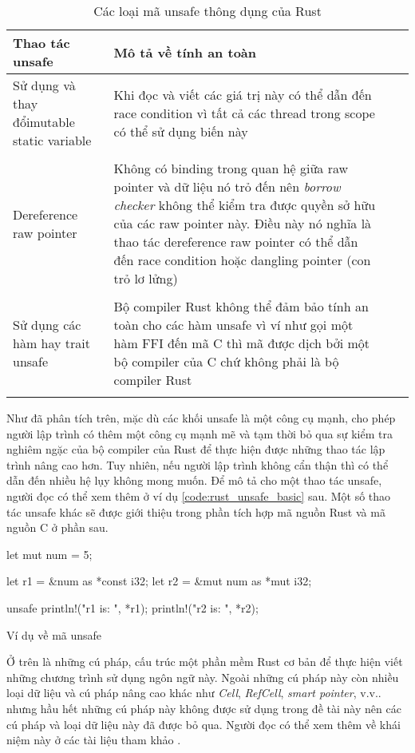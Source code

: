 \begin{longtable}{>{\raggedleft\arraybackslash}p{6cm}|p{7cm}  >{\raggedleft\arraybackslash}p{5cm}|p{7cm}}
\textbf{Thao tác unsafe} & \textbf{Mô tả về tính an toàn} \\
\midrule
\endhead
Sử dụng và thay đổi\linebreak mutable static variable & Khi đọc và viết các giá trị này có thể dẫn đến race condition vì tất cả các thread trong scope có thể sử dụng biến này \\
\\
Dereference raw pointer & Không có binding trong quan hệ giữa raw pointer và dữ liệu nó trỏ đến nên \emph{borrow checker} không thể kiểm tra được quyền sở hữu của các raw pointer này. Điều này nó nghĩa là thao tác dereference raw pointer có thể dẫn đến race condition hoặc dangling pointer (con trỏ lơ lửng)\\
\\
Sử dụng các hàm hay trait unsafe & Bộ compiler Rust không thể đảm bảo tính an toàn cho các hàm unsafe vì ví như gọi một hàm FFI đến mã C thì mã được dịch bởi một bộ compiler của C chứ không phải là bộ compiler Rust\\
\bottomrule
\caption{Các loại mã unsafe thông dụng của Rust}
\label{tbl:rust_unsafe}
\end{longtable}
Như đã phân tích trên, mặc dù các khối unsafe là một công cụ mạnh, cho phép người lập trình có thêm một công cụ mạnh mẽ và tạm thời bỏ qua sự kiểm tra nghiêm ngặc của bộ compiler của Rust để thực hiện được những thao tác lập trình nâng cao hơn.
Tuy nhiên, nếu người lập trình không cẩn thận thì có thể dẫn đến nhiều hệ lụy không mong muốn.
Để mô tả cho một thao tác unsafe, người đọc có thể xem thêm ở ví dụ \ref{code:rust_unsafe_basic} sau.
Một số thao tác unsafe khác sẽ được giới thiệu trong phần tích hợp mã nguồn Rust và mã nguồn C ở phần sau.

\begin{listing}[H]
\begin{rustcode}
let mut num = 5;

let r1 = &num as *const i32;
let r2 = &mut num as *mut i32;

unsafe {
    println!("r1 is: {}", *r1);
    println!("r2 is: {}", *r2);
}
\end{rustcode}
\caption{Ví dụ về mã unsafe}
\label{code:rust_unsafe_basic}
\end{listing}

Ở trên là những cú pháp, cấu trúc một phần mềm Rust cơ bản để thực hiện viết những chương trình sử dụng ngôn ngữ này.
Ngoài những cú pháp này còn nhiều loại dữ liệu và cú pháp nâng cao khác như \emph{Cell}, \emph{RefCell}, \emph{smart pointer}, v.v.. nhưng hầu hết những cú pháp này không được sử dụng trong đề tài này nên các cú pháp và loại dữ liệu này đã được bỏ qua.
Người đọc có thể xem thêm về khái niệm này ở các tài liệu tham khảo \cite{rust_action, rust2018book}.

